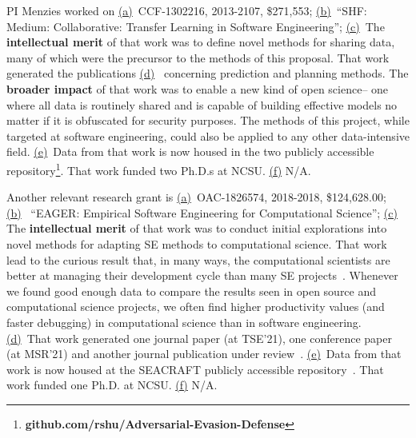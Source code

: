 PI Menzies worked on \underline{(a)}~CCF-1302216, 2013-2107, \$271,553; \underline{(b)}~``SHF: Medium: Collaborative: Transfer Learning in Software Engineering''; \underline{(c)}~The {\bf intellectual merit} of that work was to
define novel methods for sharing data, many of which were the precursor to the methods of this proposal.  That work generated the publications  \underline{(d)}~\cite{krishna2018bellwethers,peters2015lace2,he13,Me17,fu2016tuning,krishna2017learning,krishna2020whence} concerning prediction and planning methods.
The {\bf broader impact} of that work was to
enable a new kind of open science-- one where all data is routinely shared and is capable of building effective models no matter if it is obfuscated for security purposes.
The methods of this project, while targeted at software engineering, could also be applied to any other data-intensive field. \underline{(e)}~Data from that work is now housed in the two
publicly accessible repository\footnote{
{\bf github.com/rshu/Adversarial-Evasion-Defense}}. That work  funded two Ph.D.s at NCSU. \underline{(f)}
N/A. 



Another relevant research grant is 
\underline{(a)}~OAC-1826574, 2018-2018, 
\$124,628.00;
\underline{(b)}~
``EAGER: Empirical Software Engineering for Computational Science'';
\underline{(c)}~ 
The {\bf intellectual merit} of that work was to
conduct initial explorations into novel methods for adapting SE methods to computational science.
That work lead to the curious
result that, in many ways,
the computational scientists are better
at managing their development cycle
than many SE projects~\cite{tu2020changing}. Whenever
we found good enough data to compare the results
seen in open source and computational
science projects, we often find higher productivity
values (and faster debugging) in computational science
than in software engineering. 
\underline{(d)}~That work generated 
one journal paper (at TSE'21),
one conference paper (at MSR'21) and another journal publication under review~\cite{Ling21}.
 \underline{(e)}~Data from that work is now housed at the SEACRAFT publicly accessible repository~\cite{menzies2017seacraft}. That work  funded one Ph.D. at NCSU. 
 \underline{(f)} N/A.  
 
